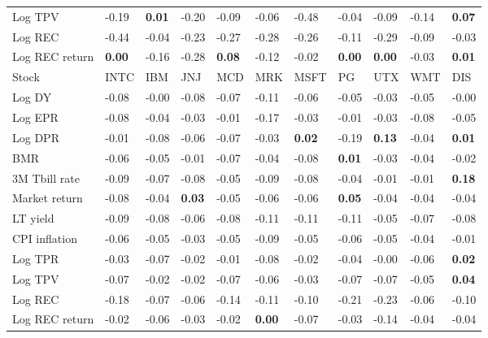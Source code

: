 \begin{table}[h!]
{\begin{center}
\begin{tabularx}{1\textwidth}{@{}X@{\hspace{0.2cm}}l@{\hspace{0.2cm}}l@{\hspace{0.2cm}}l@{\hspace{0.2cm}}l@{\hspace{0.2cm}}l@{\hspace{0.2cm}}l@{\hspace{0.2cm}}l@{\hspace{0.2cm}}l@{\hspace{0.2cm}}l@{\hspace{0.2cm}}l@{}}
 Log TPV  & -0.19	 & \textbf{0.01}	 & -0.20	 & -0.09	 & -0.06	 & -0.48	 & -0.04	 & -0.09	 & -0.14	 & \textbf{0.07}	\\
 Log REC  & -0.44	 & -0.04	 & -0.23	 & -0.27	 & -0.28	 & -0.26	 & -0.11	 & -0.29	 & -0.09	 & -0.03	\\
 Log REC return  & \textbf{0.00}	 & -0.16	 & -0.28	 & \textbf{0.08}	 & -0.12	 & -0.02	 & \textbf{0.00}	 & \textbf{0.00}	 & -0.03	 & \textbf{0.01}	\\
\midrule
\midrule
 Stock  & INTC	 & IBM	 & JNJ	 & MCD	 & MRK	 & MSFT	 & PG	 & UTX	 & WMT	 & DIS	\\
\midrule
 Log DY  & -0.08	 & -0.00	 & -0.08	 & -0.07	 & -0.11	 & -0.06	 & -0.05	 & -0.03	 & -0.05	 & -0.00	\\
 Log EPR  & -0.08	 & -0.04	 & -0.03	 & -0.01	 & -0.17	 & -0.03	 & -0.01	 & -0.03	 & -0.08	 & -0.05	\\
 Log DPR  & -0.01	 & -0.08	 & -0.06	 & -0.07	 & -0.03	 & \textbf{0.02}	 & -0.19	 & \textbf{0.13}	 & -0.04	 & \textbf{0.01}	\\
 BMR  & -0.06	 & -0.05	 & -0.01	 & -0.07	 & -0.04	 & -0.08	 & \textbf{0.01}	 & -0.03	 & -0.04	 & -0.02	\\
\midrule
 3M Tbill rate  & -0.09	 & -0.07	 & -0.08	 & -0.05	 & -0.09	 & -0.08	 & -0.04	 & -0.01	 & -0.01	 & \textbf{0.18}	\\
 Market return  & -0.08	 & -0.04	 & \textbf{0.03}	 & -0.05	 & -0.06	 & -0.06	 & \textbf{0.05}	 & -0.04	 & -0.04	 & -0.04	\\
 LT yield  & -0.09	 & -0.08	 & -0.06	 & -0.08	 & -0.11	 & -0.11	 & -0.11	 & -0.05	 & -0.07	 & -0.08	\\
 CPI inflation  & -0.06	 & -0.05	 & -0.03	 & -0.05	 & -0.09	 & -0.05	 & -0.06	 & -0.05	 & -0.04	 & -0.01	\\
\midrule
 Log TPR  & -0.03	 & -0.07	 & -0.02	 & -0.01	 & -0.08	 & -0.02	 & -0.04	 & -0.00	 & -0.06	 & \textbf{0.02}	\\
 Log TPV  & -0.07	 & -0.02	 & -0.02	 & -0.07	 & -0.06	 & -0.03	 & -0.07	 & -0.07	 & -0.05	 & \textbf{0.04}	\\
 Log REC  & -0.18	 & -0.07	 & -0.06	 & -0.14	 & -0.11	 & -0.10	 & -0.21	 & -0.23	 & -0.06	 & -0.10	\\
 Log REC return  & -0.02	 & -0.06	 & -0.03	 & -0.02	 & \textbf{0.00}	 & -0.07	 & -0.03	 & -0.14	 & -0.04	 & -0.04	\\
\bottomrule\bottomrule
\end{tabularx}
\vspace{0.2cm}

\end{center}}
\end{table}
